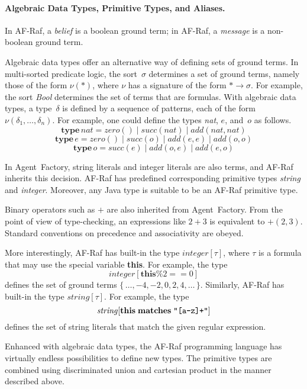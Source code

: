 \documentclass[a4paper,12pt,oneside,fleqn]{book} %
\theoremstyle{plain}
\theoremstyle{definition}
\theoremstyle{remark}
\begin{document}
\paragraph{Algebraic Data Types, Primitive Types, and Aliases.}

In AF-Raf, a \emph{belief} is a boolean ground term; in AF-Raf, a
\emph{message} is a non-boolean ground term.

Algebraic data types offer an alternative way of defining sets of ground
terms. In multi-sorted predicate logic, the sort~$\sigma$ determines a set
of ground terms, namely those of the form $\nu(*)$, where $\nu$ has a
signature of the form $*\to\sigma$.  For example, the sort \textit{Bool}
determines the set of terms that are formulas.  With algebraic data types,
a type~$\delta$ is defined by a sequence of patterns, each of the form
$\nu(\delta_1,\ldots,\delta_n)$. For example, one could define the types
\textit{nat}, $e$, and~$o$ as follows.
\[\mathbf{type}\,\mathit{nat} =
  \mathit{zero}()
  \mid\mathit{succ}(\mathit{nat})
  \mid\mathit{add}(\mathit{nat},\mathit{nat})\]
\[\mathbf{type}\,e =
  \mathit{zero}()
  \mid\mathit{succ}(o)
  \mid\mathit{add}(e,e)
  \mid\mathit{add}(o,o)\]
\[\mathbf{type}\,o =
  \mathit{succ}(e)
  \mid\mathit{add}(o,e)
  \mid\mathit{add}(e,o)\]

In Agent~Factory, string literals and integer literals are
also terms, and AF-Raf inherits this decision. AF-Raf has
predefined corresponding primitive types \textit{string} and
\textit{integer}. Moreover, any Java type is suitable to be an AF-Raf
primitive type.

Binary operators such as $+$ are also inherited from Agent~Factory. From
the point of view of type-checking, an expressions like $2+3$ is equivalent
to $+(2,3)$. Standard conventions on precedence and associativity are
obeyed.

More interestingly, AF-Raf has built-in the type $\mathit{integer}[\tau]$,
where $\tau$ is a formula that may use the special variable \textbf{this}.
For example, the type \[\mathit{integer}[\mathbf{this}\%2==0]\] defines the
set of ground terms $\{\,\ldots,-4,-2,0,2,4,\ldots\,\}$. Similarly, AF-Raf
has built-in the type $\mathit{string}[\tau]$. For example, the type
\[\mathit{string}[\mathbf{this}\;\mathbf{matches}\;\verb|"[a-z]+"|]\]
defines the set of string literals that match the given regular expression.

Enhanced with algebraic data types, the AF-Raf programming language has
virtually endless possibilities to define new types. The primitive types
are combined using discriminated union and cartesian product in the manner
described above.
\end{document}
